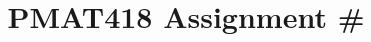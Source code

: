 \documentclass{assignment}
\title{PMAT418 Assignment \#}
\begin{document}
\begin{problemlist}
\begin{problem}
\begin{answer}
[Answer]
\end{answer}
\end{problem}

\begin{problem}
\begin{answer}
[Answer]
\end{answer}
\end{problem}

\end{problemlist}
\end{document}
